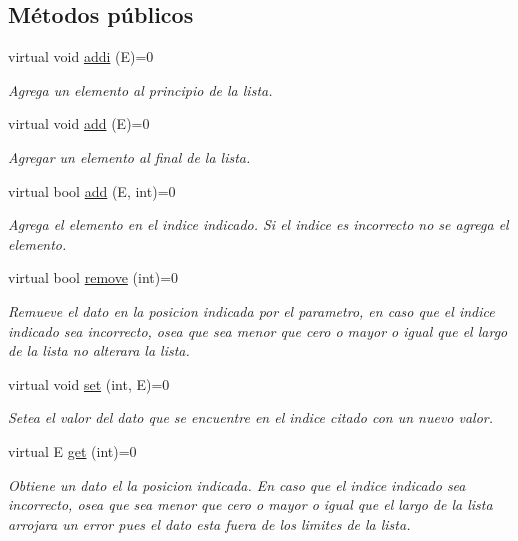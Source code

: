 \subsection*{Métodos públicos}
\begin{DoxyCompactItemize}
\item 
virtual void \hyperlink{classIList_af202dc9e748ee32238d80e57dfbcae20}{addi} (E)=0
\begin{DoxyCompactList}\small\item\em Agrega un elemento al principio de la lista. \end{DoxyCompactList}\item 
virtual void \hyperlink{classIList_a27500caa3d9da05aa6437d5ff56b09e2}{add} (E)=0
\begin{DoxyCompactList}\small\item\em Agregar un elemento al final de la lista. \end{DoxyCompactList}\item 
virtual bool \hyperlink{classIList_a70140dbc9de2b9f6e5ffd2212d5ea8b0}{add} (E, int)=0
\begin{DoxyCompactList}\small\item\em Agrega el elemento en el indice indicado. Si el indice es incorrecto no se agrega el elemento. \end{DoxyCompactList}\item 
virtual bool \hyperlink{classIList_a9bf7d737252dfbd4c9a5d7be36ea4231}{remove} (int)=0
\begin{DoxyCompactList}\small\item\em Remueve el dato en la posicion indicada por el parametro, en caso que el indice indicado sea incorrecto, osea que sea menor que cero o mayor o igual que el largo de la lista no alterara la lista. \end{DoxyCompactList}\item 
virtual void \hyperlink{classIList_a119ed658d2804aec0b9fef9325c03073}{set} (int, E)=0
\begin{DoxyCompactList}\small\item\em Setea el valor del dato que se encuentre en el indice citado con un nuevo valor. \end{DoxyCompactList}\item 
virtual E \hyperlink{classIList_a60570f7ee0e7474d01b2f364bad996a0}{get} (int)=0
\begin{DoxyCompactList}\small\item\em Obtiene un dato el la posicion indicada. En caso que el indice indicado sea incorrecto, osea que sea menor que cero o mayor o igual que el largo de la lista arrojara un error pues el dato esta fuera de los limites de la lista. \end{DoxyCompactList}\item 

\end{DoxyCompactItemize}
